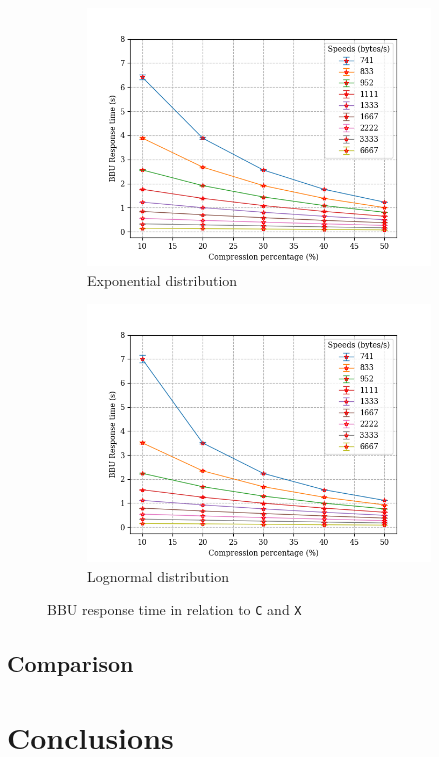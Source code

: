 \documentclass[11pt,a4paper,oneside, openright]{article}
\begin{document}
\begin{figure}[h]
	\centering
	\begin{subfigure}{.5\textwidth}
		\centering
		\includegraphics[width=\linewidth]{images/c-vs-response-time-bbu-exp}
		\caption{Exponential distribution}
		\label{fig:c-vs-response-time-bbu-exp}
	\end{subfigure}%
	\begin{subfigure}{.5\textwidth}
		\centering
		\includegraphics[width=\linewidth]{images/c-vs-response-time-bbu-logn}
		\caption{Lognormal distribution}
		\label{fig:c-vs-response-time-bbu-logn}
	\end{subfigure}
	\caption{BBU response time in relation to \texttt{C} and \texttt{X}}
	\label{fig:c-vs-response-time-bbu}
\end{figure}

\subsection{Comparison}



\section{Conclusions}
\end{document}
